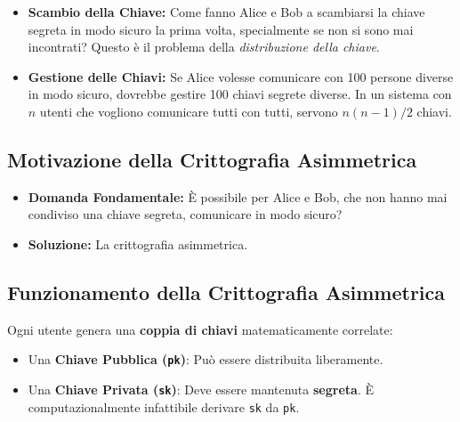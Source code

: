 \begin{itemize}
    \item \textbf{Scambio della Chiave:} Come fanno Alice e Bob a scambiarsi la chiave segreta in modo sicuro la prima volta, specialmente se non si sono mai incontrati? Questo è il problema della \textit{distribuzione della chiave}.
    \item \textbf{Gestione delle Chiavi:} Se Alice volesse comunicare con 100 persone diverse in modo sicuro, dovrebbe gestire 100 chiavi segrete diverse. In un sistema con $n$ utenti che vogliono comunicare tutti con tutti, servono $n(n-1)/2$ chiavi.
\end{itemize}

\subsection{Motivazione della Crittografia Asimmetrica}
\begin{itemize}
    \item \textbf{Domanda Fondamentale:} È possibile per Alice e Bob, che non hanno mai condiviso una chiave segreta, comunicare in modo sicuro?
    \item \textbf{Soluzione:} La crittografia asimmetrica.
\end{itemize}

\subsection{Funzionamento della Crittografia Asimmetrica}
Ogni utente genera una \textbf{coppia di chiavi} matematicamente correlate:
\begin{itemize}
    \item Una \textbf{Chiave Pubblica (\texttt{pk})}: Può essere distribuita liberamente.
    \item Una \textbf{Chiave Privata (\texttt{sk})}: Deve essere mantenuta \textbf{segreta}. È computazionalmente infattibile derivare \texttt{sk} da \texttt{pk}.
\end{itemize}

